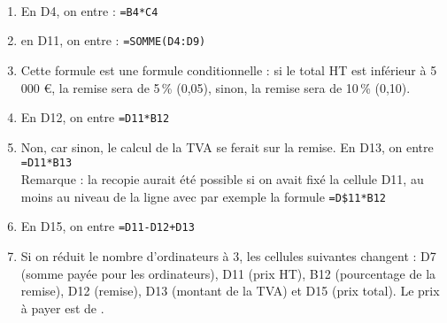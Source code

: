 \ \\ [-5mm]
   \begin{enumerate}
      \item En D4, on entre : {\blue\texttt{=B4*C4}}
      \item en D11, on entre : {\blue\texttt{=SOMME(D4:D9)}}
      \item Cette formule est une formule conditionnelle : si le total HT est inférieur à 5 000 \euro, la remise sera de 5\,\% (0,05), sinon, la remise sera de 10\,\% (0,10).
      \item En D12, on entre {\blue\texttt{=D11*B12}}
      \item Non, car sinon, le calcul de la TVA se ferait sur la remise. En D13, on entre {\blue\texttt{=D11*B13}} \\
   Remarque : la recopie aurait été possible si on avait fixé la cellule D11, au moins au niveau de la ligne avec par exemple la formule {\blue\texttt{=D\$11*B12}}
      \item En D15, on entre {\blue\texttt{=D11-D12+D13}}
      \item Si on réduit le nombre d'ordinateurs à 3, les cellules suivantes changent : D7 (somme payée pour les ordinateurs), D11 (prix HT), B12 (pourcentage de la remise), D12 (remise), D13 (montant de la TVA) et D15 (prix total). Le prix à payer est de {\blue {}}.
   \end{enumerate}
